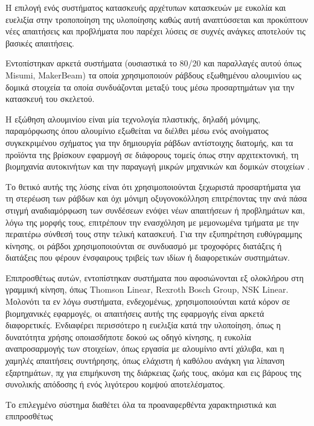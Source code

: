Η επιλογή ενός συστήματος κατασκευής αρχέτυπων κατασκευών με ευκολία και
ευελιξία στην τροποποίηση της υλοποίησης καθώς αυτή αναπτύσσεται και
προκύπτουν νέες απαιτήσεις και προβλήματα που παρέχει λύσεις σε συχνές ανάγκες
αποτελούν τις βασικές απαιτήσεις.

Εντοπίστηκαν αρκετά συστήματα (ουσιαστικά το 80/20 και παραλλαγές αυτού όπως
Misumi, MakerBeam) τα οποία χρησιμοποιούν ράβδους εξωθημένου αλουμινίου ως
δομικά στοιχεία τα οποία συνδυάζονται μεταξύ τους μέσω προσαρτημάτων για την
κατασκευή του σκελετού.

Η εξώθηση αλουμινίου είναι μία τεχνολογία πλαστικής, δηλαδή μόνιμης,
παραμόρφωσης όπου αλουμίνιο εξωθείται να διέλθει μέσω ενός ανοίγματος
συγκεκριμένου σχήματος για την δημιουργία ράβδων αντίστοιχης διατομής, και τα
προϊόντα της βρίσκουν εφαρμογή σε διάφορους τομείς όπως στην αρχιτεκτονική,
τη βιομηχανία αυτοκινήτων και την παραγωγή μικρών μηχανικών και δομικών
στοιχείων \parencite{saha00}.

Το θετικό αυτής της λύσης είναι ότι χρησιμοποιούνται ξεχωριστά προσαρτήματα για
τη στερέωση των ράβδων και όχι μόνιμη οξυγονοκόλληση επιτρέποντας την ανά πάσα
στιγμή αναδιαμόρφωση των συνδέσεων ενόψει νέων απαιτήσεων ή προβλημάτων και,
λόγω της μορφής τους, επιτρέπουν την ενασχόληση με μεμονωμένα τμήματα με την
περαιτέρω σύνθεσή τους στην τελική κατασκευή.
Για την εξυπηρέτηση ευθύγραμμης κίνησης, οι ράβδοι χρησιμοποιούνται σε συνδυασμό
με τροχοφόρες διατάξεις ή διατάξεις που φέρουν ένσφαιρους τριβείς των ιδίων ή
διαφορετικών συστημάτων.

Επιπροσθέτως αυτών, εντοπίστηκαν συστήματα που αφοσιώνονται εξ ολοκλήρου στη
γραμμική κίνηση, όπως Thomson Linear, Rexroth Bosch Group, NSK Linear.
Μολονότι τα εν λόγω συστήματα, ενδεχομένως, χρησιμοποιούνται κατά κόρον σε
βιομηχανικές εφαρμογές, οι απαιτήσεις αυτής της εφαρμογής είναι αρκετά
διαφορετικές. Ενδιαφέρει περισσότερο η ευελιξία κατά την υλοποίηση, όπως η
δυνατότητα χρήσης οποιασδήποτε δοκού ως οδηγό κίνησης, η ευκολία αναπροσαρμογής
των στοιχείων, όπως εργασία με αλουμίνιο αντί χάλυβα, και η χαμηλές απαιτήσεις
συντήρησης, όπως ελάχιστη ή καθόλου ανάγκη για λίπανση εξαρτημάτων, πχ για
επιμήκυνση της διάρκειας ζωής τους, ακόμα και εις βάρους της συνολικής απόδοσης
ή ενός λιγότερου κομψού αποτελέσματος.


Το επιλεγμένο σύστημα διαθέτει όλα τα προαναφερθέντα χαρακτηριστικά και
επιπροσθέτως 


